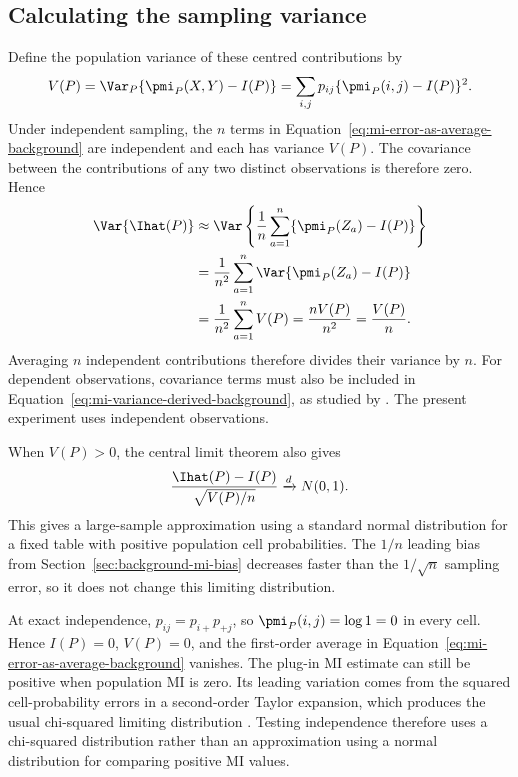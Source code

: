 \subsection{Calculating the sampling variance}

Define the population variance of these centred contributions by
\begin{equation}
  V(P)
  =\Var_P\{\pmi_P(X,Y)-I(P)\}
  =\sum_{i,j}p_{ij}\{\pmi_P(i,j)-I(P)\}^2.
  \label{eq:mi-variance-background}
\end{equation}
Under independent sampling, the \(n\) terms in
Equation~\eqref{eq:mi-error-as-average-background} are independent and each
has variance \(V(P)\). The covariance between the contributions of any two
distinct observations is therefore zero. Hence
\begin{align}
  \Var\{\Ihat(P)\}
  &\approx
  \Var\left\{
    \frac{1}{n}\sum_{a=1}^{n}
    \{\pmi_P(Z_a)-I(P)\}
  \right\}
  \notag\\
  &=\frac{1}{n^2}
    \sum_{a=1}^{n}\Var\{\pmi_P(Z_a)-I(P)\}
  \notag\\
  &=\frac{1}{n^2}\sum_{a=1}^{n}V(P)
  =\frac{nV(P)}{n^2}
  =\frac{V(P)}{n}.
  \label{eq:mi-variance-derived-background}
\end{align}
Averaging \(n\) independent contributions therefore divides their variance
by \(n\). For dependent observations, covariance terms must also be included
in Equation~\eqref{eq:mi-variance-derived-background}, as studied by
\citet{moddemeijer1999}. The present experiment uses independent observations.

When \(V(P)>0\), the central limit theorem also gives
\begin{equation}
  \frac{\Ihat(P)-I(P)}{\sqrt{V(P)/n}}
  \xrightarrow{d}N(0,1).
  \label{eq:mi-clt-background}
\end{equation}
This gives a large-sample approximation using a standard normal distribution
for a fixed table with positive population cell probabilities. The \(1/n\)
leading bias from Section~\ref{sec:background-mi-bias} decreases faster than the
\(1/\sqrt n\) sampling error, so it does not change this limiting
distribution.

\medskip
{}
\nopagebreak[4]

At exact independence, \(p_{ij}=p_{i+}p_{+j}\), so
\(\pmi_P(i,j)=\log 1=0\) in every cell. Hence \(I(P)=0\), \(V(P)=0\), and the
first-order average in Equation~\eqref{eq:mi-error-as-average-background}
vanishes.
The plug-in MI estimate can still be positive when population MI is zero.
Its leading variation comes from
the squared cell-probability errors in a second-order Taylor expansion, which
produces the usual chi-squared limiting distribution
\citep{brillinger2004,marinescu2025}. Testing independence therefore uses a
chi-squared distribution rather than an approximation using a normal
distribution for comparing positive MI values.

